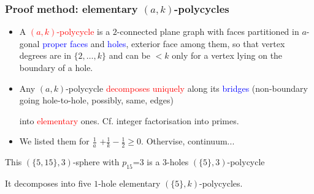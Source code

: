 \documentclass{beamer}
\begin{document}
\begin{frame}\frametitle{Proof method: elementary $(a,k)$-polycycles}
\vspace{-3.5mm}
\begin{itemize}
\item A \textcolor{red}{$(a,k)$-polycycle} is a
$2$-connected plane graph with faces partitioned
in  $a$-gonal
\textcolor{blue}{proper  faces} and 
\textcolor{blue}{holes}, exterior face among them, 
so that
vertex degrees are  in $\{2,\dots ,k\}$ and  can be  $<k$
only for a  vertex lying on the
boundary of a hole.
\item Any $(a,k)$-polycycle \textcolor{red}{decomposes uniquely} along 
its \textcolor{blue}{bridges} (non-boundary  going   
hole-to-hole, possibly, same, edges)

into  \textcolor{red}{elementary} ones. Cf. integer factorisation into 
primes.  
\item We listed them for $\frac{1}{a}$ +$\frac{1}{k}-\frac{1}{2}$$\ge$$0$. Othervise, 
continuum...  
\end{itemize}

\begin{center}
\begin{minipage}[b]{20mm}
\centering
{}\par
\end{minipage}
\end{center} 
This $(\{5,15\},3)$-sphere with $p_{15}$=$3$ 
is a $3$-holes $(\{5\},3)$-polycycle 

It decomposes into five
$1$-hole elementary $(\{5\},k)$-polycycles.

\end{frame} 

\end{document}
